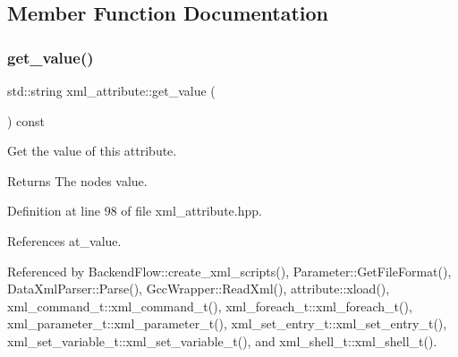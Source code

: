 \subsection{Member Function Documentation}
\mbox{\label{classxml__attribute_a38547e5c171a59ea5712226b65f5a571}} 
\subsubsection{\texorpdfstring{get\+\_\+value()}{get\_value()}}
{\footnotesize\ttfamily std\+::string xml\+\_\+attribute\+::get\+\_\+value (\begin{DoxyParamCaption}{ }\end{DoxyParamCaption}) const\hspace{0.3cm}{\ttfamily [inline]}}



Get the value of this attribute. 

\begin{DoxyReturn}{Returns}
The node\textquotesingle{}s value. 
\end{DoxyReturn}


Definition at line 98 of file xml\+\_\+attribute.\+hpp.



References at\+\_\+value.



Referenced by Backend\+Flow\+::create\+\_\+xml\+\_\+scripts(), Parameter\+::\+Get\+File\+Format(), Data\+Xml\+Parser\+::\+Parse(), Gcc\+Wrapper\+::\+Read\+Xml(), attribute\+::xload(), xml\+\_\+command\+\_\+t\+::xml\+\_\+command\+\_\+t(), xml\+\_\+foreach\+\_\+t\+::xml\+\_\+foreach\+\_\+t(), xml\+\_\+parameter\+\_\+t\+::xml\+\_\+parameter\+\_\+t(), xml\+\_\+set\+\_\+entry\+\_\+t\+::xml\+\_\+set\+\_\+entry\+\_\+t(), xml\+\_\+set\+\_\+variable\+\_\+t\+::xml\+\_\+set\+\_\+variable\+\_\+t(), and xml\+\_\+shell\+\_\+t\+::xml\+\_\+shell\+\_\+t().

